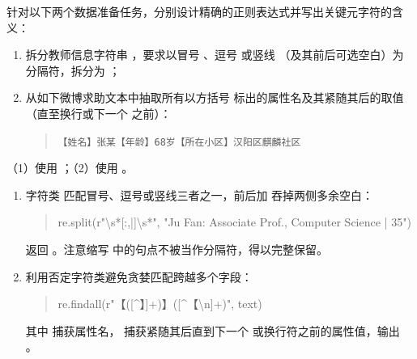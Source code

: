 \begin{exercise}[title={正则表达式设计与日志信息抽取},level=standard,points=12,tags={正则表达式,文本抽取}]
针对以下两个数据准备任务，分别设计精确的正则表达式并写出关键元字符的含义：
\begin{enumerate}
  \item 拆分教师信息字符串 ，要求以冒号 \lcinline{:}、逗号 \lcinline{,} 或竖线 \lcinline{|}（及其前后可选空白）为分隔符，拆分为 ；
  \item 从如下微博求助文本中抽取所有以方括号  标出的属性名及其紧随其后的取值（直至换行或下一个  之前）：
  \begin{quote}\small
    \texttt{【姓名】张某【年龄】68岁【所在小区】汉阳区麒麟社区}
  \end{quote}
\end{enumerate}
\begin{answer}
（1）使用 ；（2）使用 。
\end{answer}
\begin{solution}
\begin{enumerate}
  \item 字符类 \lcinline{[:,|]} 匹配冒号、逗号或竖线三者之一，前后加  吞掉两侧多余空白：
  \begin{quote}\ttfamily\small
    re.split(r"\textbackslash s*[:,|]\textbackslash s*", "Ju Fan: Associate Prof., Computer Science | 35")
  \end{quote}
  返回 。注意缩写  中的句点不被当作分隔符，得以完整保留。
  \item 利用否定字符类避免贪婪匹配跨越多个字段：
  \begin{quote}\ttfamily\small
    re.findall(r"【([\^{}】]+)】([\^{}【\textbackslash n]+)", text)
  \end{quote}
  其中 \lcinline{([\^{}】]+)} 捕获属性名，\lcinline{([\^{}【\textbackslash n]+)} 捕获紧随其后直到下一个  或换行符之前的属性值，输出 。
\end{enumerate}
\end{solution}
\end{exercise}


